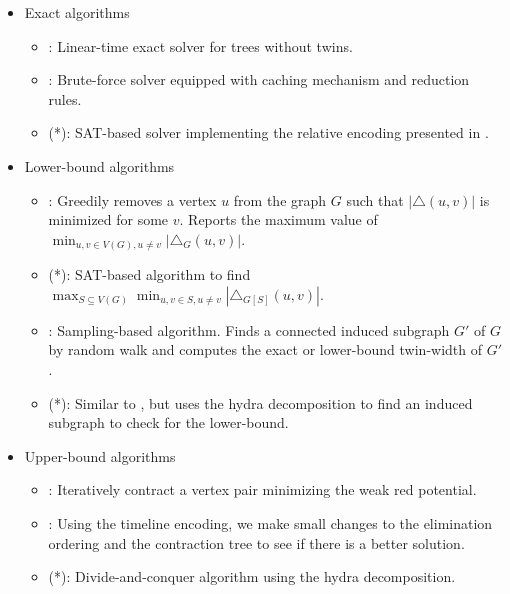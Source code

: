 \documentclass[a4paper,UKenglish,cleveref, autoref, thm-restate]{lipics-v2021}
\begin{document}
\begin{itemize}
    \item Exact algorithms
    \begin{itemize}
        \item \primetreesolver : Linear-time exact solver for trees without twins.
        \item \branchsolver : Brute-force solver equipped with caching mechanism and reduction rules.
        \item \directsolver (*): SAT-based solver implementing the relative encoding presented in \cite{schidler_sat_2021}.
    \end{itemize}
    \item Lower-bound algorithms
    \begin{itemize}
        \item \lbgreedy : Greedily removes a vertex $u$ from the graph $G$
        such that $|\triangle(u,v)|$ is minimized for some $v$.
        Reports the maximum value of $\displaystyle \min_{u,v \in V(G), u \neq v} |\triangle_{G} (u,v)|$.
        \item \lbcore (*): SAT-based algorithm to find 
        $\displaystyle \max_{S \subseteq V(G)} \min_{u,v \in S, u \neq v} |\triangle_{G[S]} (u,v)|$.
        \item \lbsample : Sampling-based algorithm.
        Finds a connected induced subgraph $G'$ of $G$
        by random walk and computes the exact or lower-bound twin-width of $G'$.
        \item \lbseparate (*): Similar to \lbsample, but uses the hydra decomposition to
        find an induced subgraph to check for the lower-bound.
    \end{itemize}
    \item Upper-bound algorithms
    \begin{itemize}
        \item \ubgreedy : Iteratively contract a vertex pair minimizing the weak red potential.
        \item \ublocalsearch : Using the timeline encoding, we make small changes to
        the elimination ordering and the contraction tree to see if there is a better solution.
        \item \ubseparate (*): Divide-and-conquer algorithm using the hydra decomposition.
    \end{itemize}
\end{itemize}

\end{document}
